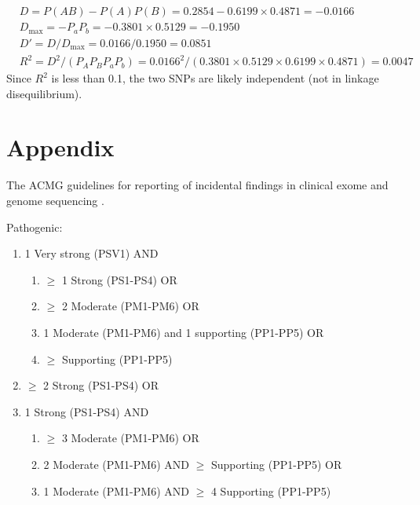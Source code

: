 \documentclass{article}
\begin{document}
\begin{itemize}
\begin{align*}
    & D = P(AB) - P(A)P(B) = 0.2854 - 0.6199 \times 0.4871 = -0.0166\\
    & D_{\text{max}} = - P_a P_b = -0.3801 \times 0.5129 = -0.1950\\
    & D' = D/D_{\text{max}} = 0.0166/0.1950 = 0.0851\\
    & R^2 = D^2/(P_A P_B P_a P_b) = 0.0166^2/(0.3801 \times 0.5129 \times 0.6199 \times 0.4871) = 0.0047
\end{align*}
Since $R^2$ is less than 0.1, the two SNPs are likely independent (not in linkage disequilibrium).
\end{itemize}

\section*{Appendix}
The ACMG guidelines for reporting of incidental findings in clinical exome and genome sequencing \cite{ACMG}.

Pathogenic:
\begin{enumerate}
    \item 1 Very strong (PSV1) AND
    \begin{enumerate}
        \item $\geq$ 1 Strong (PS1-PS4) OR 
        \item $\geq$ 2 Moderate (PM1-PM6) OR
        \item 1 Moderate (PM1-PM6) and 1 supporting (PP1-PP5) OR
        \item $\geq$ Supporting (PP1-PP5)
    \end{enumerate}
    \item $\geq$ 2 Strong (PS1-PS4) OR
    \item 1 Strong (PS1-PS4) AND
    \begin{enumerate}
        \item $\geq$ 3 Moderate (PM1-PM6) OR
        \item 2 Moderate (PM1-PM6) AND $\geq$ Supporting (PP1-PP5) OR
        \item 1 Moderate (PM1-PM6) AND $\geq$ 4 Supporting (PP1-PP5)
    \end{enumerate}
\end{enumerate}



\end{document}
